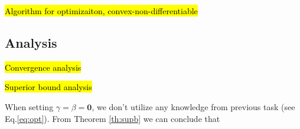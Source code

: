 \hl{Algorithm for optimizaiton, convex-non-differentiable}


\subsection{Analysis}
\hl{Convergence analysis}

\hl{Superior bound analysis}


When setting $\gamma=\beta = \mathbf{0}$, we don't utilize any knowledge from previous task (see Eq.\eqref{eq:opt}). From Theorem \ref{th:supb} we can conclude that 